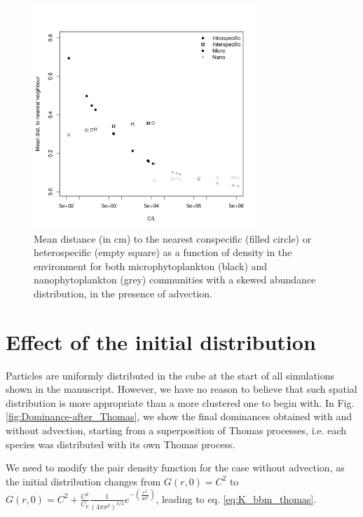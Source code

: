 \documentclass[english]{article}
\begin{document}
\begin{figure}[H]
\begin{centering}
\includegraphics[width=0.75\textwidth]{../code/figure/dist_abundances_10sp_v2}
\par\end{centering}
\caption{Mean distance (in cm) to the nearest conspecific (filled circle) or
heterospecific (empty square) as a function of density in the environment
for both microphytoplankton (black) and nanophytoplankton (grey) communities
with a skewed abundance distribution, in the presence of advection.\label{fig:Distance_abundance}}
\end{figure}


\section{Effect of the initial distribution}

Particles are uniformly distributed in the cube at the start of all
simulations shown in the manuscript. However, we have no reason to
believe that such spatial distribution is more appropriate than a
more clustered one to begin with. In Fig. \ref{fig:Dominance-after_Thomas},
we show the final dominances obtained with and without advection,
starting from a superposition of Thomas processes, i.e. each species
was distributed with its own Thomas process. 

We need to modify the pair density function for the case without advection,
as the initial distribution changes from $G(r,0)=C^{2}$ to $G(r,0)=C^{2}+\frac{C^{2}}{C_{p}}\frac{1}{\left(4\pi\sigma^{2}\right)^{3/2}}e^{-\left(\frac{r^{2}}{4\sigma^{2}}\right)}$,
leading to eq. \ref{eq:K_bbm_thomas}.
\end{document}
